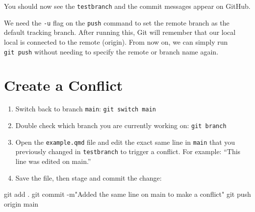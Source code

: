 \documentclass[
  11pt,
  letterpaper,
  DIV=11,
  numbers=noendperiod]{scrartcl}
\newenvironment{Shaded}{\begin{snugshade}}{\end{snugshade}}
\newcommand{\AttributeTok}[1]{\textcolor[rgb]{0.40,0.45,0.13}{#1}}
\newcommand{\FunctionTok}[1]{\textcolor[rgb]{0.28,0.35,0.67}{#1}}
\newcommand{\NormalTok}[1]{\textcolor[rgb]{0.00,0.23,0.31}{#1}}
\newcommand{\StringTok}[1]{\textcolor[rgb]{0.13,0.47,0.30}{#1}}
\providecommand{\tightlist}{%
  \setlength{\itemsep}{0pt}\setlength{\parskip}{0pt}}\usepackage{longtable,booktabs,array}
\let\textttOrig\texttt
\renewcommand{\texttt}[1]{\textttOrig{\colorbox{codebggray}{\textcolor{codefontcolor}{#1}}}}
\begin{document}
You should now see the \texttt{testbranch} and the commit messages
appear on GitHub.

\begin{tcolorbox}[enhanced jigsaw, colback=white, colframe=quarto-callout-tip-color-frame, bottomtitle=1mm, titlerule=0mm, toptitle=1mm, breakable, opacitybacktitle=0.6, opacityback=0, leftrule=.75mm, colbacktitle=quarto-callout-tip-color!10!white, title=\textcolor{quarto-callout-tip-color}{\faLightbulb}\hspace{0.5em}{Tip}, arc=.35mm, coltitle=black, toprule=.15mm, rightrule=.15mm, bottomrule=.15mm, left=2mm]

We need the \texttt{-u} flag on the \texttt{push} command to set the
remote branch as the default tracking branch. After running this, Git
will remember that our local local is connected to the remote (origin).
From now on, we can simply run \texttt{git\ push} without needing to
specify the remote or branch name again.

\end{tcolorbox}

\section{Create a Conflict}\label{create-a-conflict}

\begin{enumerate}
\def\labelenumi{\arabic{enumi}.}
\tightlist
\item
  Switch back to branch \texttt{main}: \texttt{git\ switch\ main}
\item
  Double check which branch you are currently working on:
  \texttt{git\ branch}
\item
  Open the \texttt{example.qmd} file and edit the exact same line in
  \texttt{main} that you previously changed in \texttt{testbranch} to
  trigger a conflict. For example: ``This line was edited on main.''
\item
  Save the file, then stage and commit the change:
\end{enumerate}

\begin{Shaded}
\begin{Highlighting}[]
\FunctionTok{git}\NormalTok{ add .}
\FunctionTok{git}\NormalTok{ commit }\AttributeTok{{-}m}\StringTok{"Added the same line on main to make a conflict"}
\FunctionTok{git}\NormalTok{ push origin main}
\end{Highlighting}
\end{Shaded}
\end{document}
